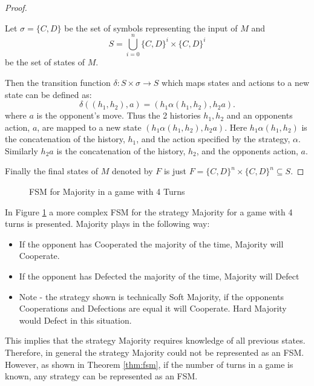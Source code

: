 \begin{proof}\label{prf:fsm}

Let $\sigma = \{C, D\}$ be the set of symbols representing the input of $M$ and
$$ S = \bigcup_{i=0}^{n} \{C, D\}^i \times \{C, D\}^i $$
be the set of states of $M$.

Then the transition function $\delta: S \times \sigma \rightarrow S$ which maps states and actions to a new state can be defined as:
$$
\delta((h_1, h_2), a) = (h_1 \alpha(h_1, h_2), h_2a).
$$
where $a$ is the opponent's move.
Thus the 2 histories $h_1, h_2$ and an opponents action, $a$, are mapped to a new state $(h_1 \alpha(h_1, h_2), h_2a)$.
Here $h_1 \alpha(h_1, h_2)$ is the concatenation of the history, $h_1$, and the action specified by the strategy, $\alpha$.
Similarly $h_2a$ is the concatenation of the history, $h_2$, and the opponents action, $a$.

Finally the final states of $M$ denoted by $F$ is just $F = \{C, D\}^{n} \times \{C, D\}^{n} \subseteq S$.

\end{proof}


\begin{figure}[hbtp!]
\centering

\caption{FSM for Majority in a game with 4 Turns}
\label{fig:MajorityFSM}
\end{figure}

In Figure \ref{fig:MajorityFSM} a more complex FSM for the strategy Majority for a game with 4 turns is presented.
Majority plays in the following way:

\begin{itemize}
  \item If the opponent has Cooperated the majority of the time, Majority will Cooperate.
  \item If the opponent has Defected the majority of the time, Majority will Defect
  \item Note - the strategy shown is technically Soft Majority, if the opponents Cooperations and Defections are equal it will Cooperate. Hard Majority would Defect in this situation.
\end{itemize}

This implies that the strategy Majority requires knowledge of all previous states.
Therefore, in general the strategy Majority could not be represented as an FSM.
However, as shown in Theorem \ref{thm:fsm}, if the number of turns in a game is known, any strategy can be represented as an FSM.














